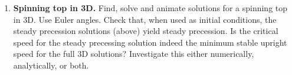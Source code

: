 \documentclass[11pt]{article}
\def\tight{ \setlength{\itemsep}{1.5pt}\setlength{\parskip}{0pt}\setlength{\parsep}{0pt}}
\begin{document}
\begin{enumerate}
The laws of mechanics, with the contact conditions, give  restrictions
on the radius of the circular motions $R$, $\omega_s$, the precession rate $\omega_p$, and the lean angle $\phi$.  Find these for these cases:
\begin{enumerate}\tight
\item  All solutions with no slip
\item All solutions with no friction.
\item The intersection of the two (all solutions with no slip and no friction), these are the most famous ones.
\end{enumerate}

\item \textbf{Spinning top  in 3D.} Find, solve and animate solutions for a spinning top  in 3D.  Use Euler angles.
Check that, when used as initial conditions, the steady precession solutions (above) yield steady precession. 
 Is the critical speed for the steady precessing solution indeed the minimum stable upright speed for the full 3D solutions? Investigate this either
 numerically, analytically, or both.

\end{enumerate}
\end{document}
